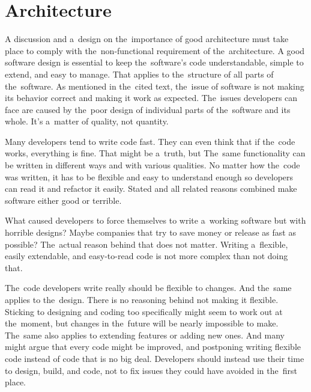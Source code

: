 \section{Architecture}

A discussion and a~design on the~importance of good architecture must take place to comply with the~non-functional requirement of the~architecture.
A good software design is essential to keep the~software's code understandable, simple to extend, and easy to manage.
That applies to the~structure of all parts of the~software.
As mentioned in the~cited text, the~issue of software is not making its behavior correct and making it work as expected.
The~issues developers can face are caused by the~poor design of individual parts of the~software and its whole.
It's a~matter of quality, not quantity.

Many developers tend to write code fast.
They can even think that if the~code works, everything is fine.
That might be a~truth, but 
The~same functionality can be written in different ways and with various qualities.
No matter how the~code was written, it has to be flexible and easy to understand enough so developers can read it and refactor it easily.
Stated and all related reasons combined make software either good or terrible.

What caused developers to force themselves to write a~working software but with horrible designs?
Maybe companies that try to save money or release as fast as possible?
The~actual reason behind that does not matter.
Writing a~flexible, easily extendable, and easy-to-read code is not more complex than not doing that.

The~code developers write really should be flexible to changes.
And the~same applies to the~design.
There is no reasoning behind not making it flexible.
Sticking to designing and coding too specifically might seem to work out at the~moment, but changes in the~future will be nearly impossible to make.
The~same also applies to extending features or adding new ones.
And many might argue that every code might be improved, and postponing writing flexible code instead of code that  is no big deal.
Developers should instead use their time to design, build, and code, not to fix issues they could have avoided in the~first place.

